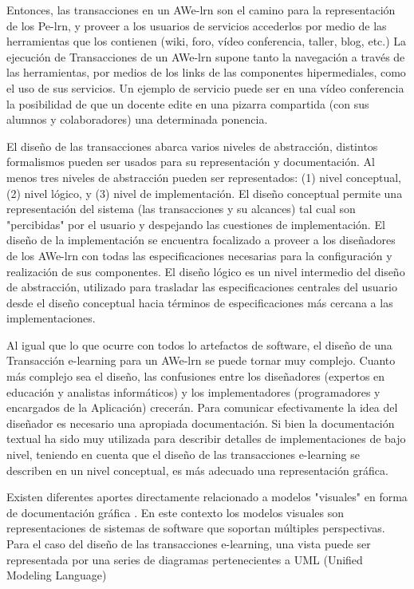 Entonces, las transacciones en un AWe-lrn son el camino para la representación
de los Pe-lrn, y proveer a los usuarios de servicios accederlos por medio de las
herramientas que los contienen (wiki, foro, vídeo conferencia, taller, blog,
etc.) La ejecución de Transacciones de un AWe-lrn supone tanto la navegación a
través de las herramientas, por medios de los links de las componentes
hipermediales, como  el uso de sus servicios. Un ejemplo de servicio puede ser
en una vídeo conferencia la posibilidad de que un docente edite en una pizarra
compartida (con sus alumnos y colaboradores) una determinada ponencia. 

El diseño de las transacciones abarca varios niveles de abstracción, distintos
formalismos pueden ser usados para su representación y documentación. Al menos
tres niveles de abstracción pueden ser representados: (1) nivel conceptual, (2)
nivel lógico, y (3) nivel de implementación.  El diseño conceptual permite una
representación del sistema (las transacciones y su alcances) tal cual son
"percibidas" por el usuario y despejando las cuestiones de implementación. El
diseño de la implementación se encuentra focalizado a proveer a los diseñadores
de los AWe-lrn con todas las especificaciones necesarias para la configuración y
realización de sus componentes. El diseño lógico es un nivel intermedio del
diseño de abstracción, utilizado para  trasladar las especificaciones centrales
del usuario desde el diseño conceptual hacia términos de  especificaciones más
cercana a las implementaciones.



Al igual que lo que ocurre con todos lo artefactos de software, el diseño de una
Transacción e-learning para un AWe-lrn  se puede tornar muy complejo. Cuanto más
complejo sea el diseño, las confusiones entre los diseñadores (expertos en
educación y analistas informáticos) y los implementadores (programadores y 
encargados de la Aplicación) crecerán. Para comunicar efectivamente la idea del
diseñador es necesario una apropiada documentación. Si bien la documentación
textual ha sido muy utilizada para describir detalles de implementaciones de
bajo nivel, teniendo en cuenta que el diseño de las transacciones e-learning se
describen en un  nivel conceptual, es más adecuado una representación gráfica. 

Existen diferentes aportes  directamente relacionado a modelos "visuales" en
forma de documentación gráfica \cite{5,10,12}. En este contexto los modelos
visuales son representaciones de sistemas de software que soportan múltiples
perspectivas. Para el caso del diseño de las transacciones e-learning, una vista
puede ser representada por una series de diagramas pertenecientes a UML (Unified
Modeling Language) \cite{UML} 

